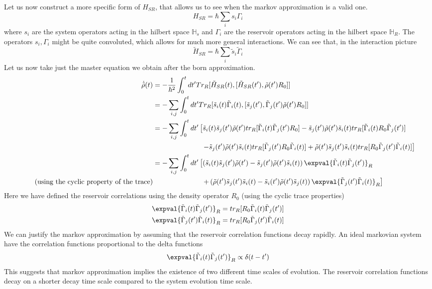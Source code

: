 \documentclass{scrartcl}
\newcommand{\1}{\mathbbm{1}}
\newcommand{\irho}{\tilde{\rho}}
\newcommand{\ihsr}{\tilde{H}_{SR}}
\newcommand{\G}{\Gamma}
\newcommand{\iG}{\tilde{\Gamma}}
\newcommand{\is}{\tilde{s}}
\newcommand{\h}{\mathbb{H}}
\begin{document}
Let us now construct a more specific form of $H_{SR}$, that allows us to see when the markov approximation is a valid one.
\[ H_{SR} = \hbar \sum_i s_i \G_i \]
where $s_i$ are the system operators acting in the hilbert space $\h_s$ and $\G_i$ are the reservoir operators
acting in the hilbert space $\h_R$. The operators $s_i, \G_i$ might be quite convoluted,
which allows for much more general interactions. We can see that, in the interaction picture
\[\ihsr = \hbar \sum_i \is_i \iG_i\]
Let us now take just the master equation we obtain after the born approximation.
\begin{align*}
	\dot{\tilde{\rho}}(t) & = -\frac{1}{\hbar^2} \int_0^t dt' Tr_R[\tilde{H}_{SR}(t), [\tilde{H}_{SR}(t'), \tilde{\rho}(t')R_0]]                                                     \\
	                      & = - \sum_{i,j} \int_0^t dt' Tr_R[\is_i(t) \iG_i(t), [\is_j(t'), \iG_j(t') \tilde{\rho}(t')R_0]]                                                          \\
	                      & = - \sum_{i,j} \int_0^t dt' \left[ \is_i(t)\is_j(t')\irho(t') tr_R[\iG_i(t)\iG_j(t')R_0] - \is_j(t')\irho(t')\is_i(t) tr_R[\iG_i(t)R_0\iG_j(t')] \right. \\
	                      & \hspace{7em}\left.- \is_j(t')\irho(t') \is_i(t)tr_R[\iG_j(t')R_0\iG_i(t)] + \irho(t')\is_j(t')\is_i(t) tr_R[R_0\iG_j(t')\iG_i(t)] \right]                \\
	                      & = -\sum_{i,j} \int_0^t dt' \left[ \left( \is_i(t)\is_j(t')\irho(t') -\is_j(t')\irho(t')\is_i(t) \right) \expval{\iG_i(t)\iG_j(t')}_R \right.             \\
		\tag{using the cyclic property of the trace}
	                      & \hspace{7em}\left. + \left( \irho(t')\is_j(t')\is_i(t) - \is_i(t')\irho(t')\is_j(t) \right) \expval{\iG_j(t')\iG_i(t)}_R \right]
\end{align*}
Here we have defined the reservoir correlations using the density operator $R_0$ (using the cyclic trace properties)
\begin{align}
	\expval{\iG_i(t)\iG_j(t')}_R & = tr_R[R_0 \iG_i(t)\iG_j(t')] \\
	\expval{\iG_j(t')\iG_i(t)}_R & = tr_R[R_0 \iG_j(t')\iG_i(t)]
\end{align}
We can justify the markov approximation by assuming that the reservoir correlation functions decay rapidly. An ideal markovian
system have the correlation functions proportional to the delta functions
\begin{align*}
	\expval{\iG_i(t)\iG_j(t')}_R \propto \delta(t-t')
\end{align*}
This suggests that markov approximation implies the existence of two different time scales of evolution. The
reservoir correlation functions decay on a shorter decay time scale compared to the system evolution time scale.
\end{document}
